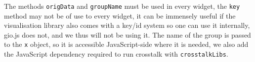 \documentclass[
]{krantz}
\makeatletter
\newenvironment{Shaded}{\begin{snugshade}}{\end{snugshade}}
\newcommand{\CommentTok}[1]{\textcolor[rgb]{0.37,0.37,0.37}{\textit{#1}}}
\newcommand{\KeywordTok}[1]{\textcolor[rgb]{0.27,0.27,0.27}{\textbf{#1}}}
\newcommand{\NormalTok}[1]{#1}
\newcommand{\OperatorTok}[1]{\textcolor[rgb]{0.43,0.43,0.43}{\textbf{#1}}}
\newenvironment{kframe}{%
\medskip{}
\setlength{\fboxsep}{.8em}
 \def\at@end@of@kframe{}%
 \ifinner\ifhmode%
  \def\at@end@of@kframe{\end{minipage}}%
  \begin{minipage}{\columnwidth}%
 \fi\fi%
 \def\FrameCommand##1{\hskip\@totalleftmargin \hskip-\fboxsep
 \colorbox{shadecolor}{##1}\hskip-\fboxsep
     \hskip-\linewidth \hskip-\@totalleftmargin \hskip\columnwidth}%
 \MakeFramed {\advance\hsize-\width
   \@totalleftmargin\z@ \linewidth\hsize
   \@setminipage}}%
 {\par\unskip\endMakeFramed%
 \at@end@of@kframe}
\renewenvironment{Shaded}{\begin{kframe}}{\end{kframe}}
\makeatother
\begin{document}
\begin{Shaded}
\end{Shaded}

The methods \texttt{origData} and \texttt{groupName} must be used in every widget, the \texttt{key} method may not be of use to every widget, it can be immensely useful if the visualisation library also comes with a key/id system so one can use it internally, gio.js does not, and we thus will not be using it. The name of the group is passed to the \texttt{x} object, so it is accessible JavaScript-side where it is needed, we also add the JavaScript dependency required to run crosstalk with \texttt{crosstalkLibs}.
\end{document}
